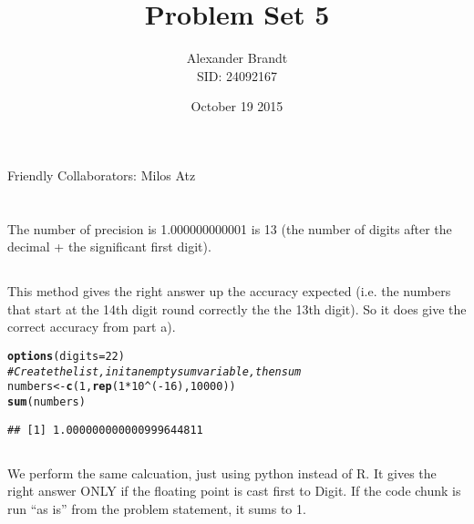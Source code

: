 \documentclass{article}\usepackage[]{graphicx}\usepackage[]{color}
\title{Problem Set 5}
\author{Alexander Brandt\\SID: 24092167}
\date{October 19 2015}
\makeatletter
\newcommand{\hlnum}[1]{\textcolor[rgb]{0.686,0.059,0.569}{#1}}%
\newcommand{\hlcom}[1]{\textcolor[rgb]{0.678,0.584,0.686}{\textit{#1}}}%
\newcommand{\hlopt}[1]{\textcolor[rgb]{0,0,0}{#1}}%
\newcommand{\hlstd}[1]{\textcolor[rgb]{0.345,0.345,0.345}{#1}}%
\newcommand{\hlkwb}[1]{\textcolor[rgb]{0.69,0.353,0.396}{#1}}%
\newcommand{\hlkwc}[1]{\textcolor[rgb]{0.333,0.667,0.333}{#1}}%
\newcommand{\hlkwd}[1]{\textcolor[rgb]{0.737,0.353,0.396}{\textbf{#1}}}%
\newenvironment{kframe}{%
 \def\at@end@of@kframe{}%
 \ifinner\ifhmode%
  \def\at@end@of@kframe{\end{minipage}}%
  \begin{minipage}{\columnwidth}%
 \fi\fi%
 \def\FrameCommand##1{\hskip\@totalleftmargin \hskip-\fboxsep
 \colorbox{shadecolor}{##1}\hskip-\fboxsep
     \hskip-\linewidth \hskip-\@totalleftmargin \hskip\columnwidth}%
 \MakeFramed {\advance\hsize-\width
   \@totalleftmargin\z@ \linewidth\hsize
   \@setminipage}}%
 {\par\unskip\endMakeFramed%
 \at@end@of@kframe}
\newenvironment{knitrout}{}{} %
\makeatother
\begin{document}
\maketitle

Friendly Collaborators: Milos Atz

\section{}

\subsection{}

The number of precision is 1.000000000001 is 13 (the number of digits after the decimal + the significant first digit).

\subsection{}

This method gives the right answer up the accuracy expected (i.e. the numbers that start at the 14th digit round correctly the the 13th digit).  So it does give the correct accuracy from part a).

\begin{knitrout}
\color{fgcolor}\begin{kframe}
\begin{alltt}
\hlkwd{options}\hlstd{(}\hlkwc{digits}\hlstd{=}\hlnum{22}\hlstd{)}
\hlcom{# Create the list, init an empty sum variable, then sum}
\hlstd{numbers} \hlkwb{<-} \hlkwd{c}\hlstd{(}\hlnum{1}\hlstd{,} \hlkwd{rep}\hlstd{(}\hlnum{1} \hlopt{*} \hlnum{10}\hlopt{^}\hlstd{(}\hlopt{-}\hlnum{16}\hlstd{),} \hlnum{10000}\hlstd{))}
\hlkwd{sum}\hlstd{(numbers)}
\end{alltt}
\begin{verbatim}
## [1] 1.000000000000999644811
\end{verbatim}
\end{kframe}
\end{knitrout}

\subsection{}

We perform the same calcuation, just using python instead of R.  It gives the right answer ONLY if the floating point is cast first to Digit.  If the code chunk is run ``as is'' from the problem statement, it sums to 1.
\end{document}
